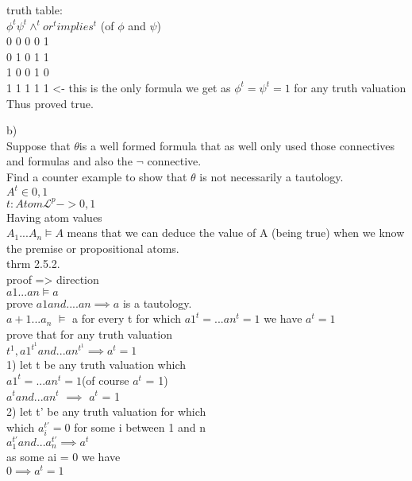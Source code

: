 \documentclass[12pt,oneside,notitlepage]{book}
\theoremstyle{definition}
\newcommand{\Lp}{\mathcal{L}^p}
\begin{document}
truth table: \\
$\phi^t \psi^t \land^t or^t implies^t$ (of $\phi$ and $\psi$) \\
0 0 0 0 1 \\
0 1 0 1 1 \\
1 0 0 1 0 \\
1 1 1 1 1 <- this is the only formula we get as $\phi^t = \psi^t = 1$ for any truth valuation \\
Thus proved true.

b) \\
Suppose that $\theta $is a well formed formula that as well only used those connectives and formulas and also the $\neg$ connective. \\
Find a counter example to show that $\theta$ is not necessarily a tautology. \\
$A^t \in { 0 , 1}$ \\ 
$t: Atom \Lp -> { 0, 1 }$ \\

Having atom values \\
$A_1...A_n \models A$ means that we can deduce the value of A (being true) when we know the premise or propositional atoms. \\

thrm 2.5.2. \\
proof => direction \\
$a1...an \models a$ \\
prove $a1 and .... an \implies a$ is a tautology. \\

$a+1 ... a_n$ $\vDash$ a for every t  for which $a1^t = ... an^t = 1$ we have $a^t = 1$ \\

prove that for any truth valuation \\
$t^1, a1^{t^1} and ... an^{t^1} \implies a^t = 1$ \\

1) let t be any truth valuation which \\ 
$a1^t = ... an^t = 1$(of course $a^t$ = 1) \\
$a^t and ... an^t$ $\implies$ $a^t$ = 1 \\
2) let t' be any truth valuation for which \\ 
which $a_{i}^{t'} = 0$ for some i between 1 and n \\
$a_{1}^{t'} and ... a_n^{t'} \implies a^t$ \\
as some ai = 0 we have \\
$0 \implies a^t = 1$ \\
\end{document}
